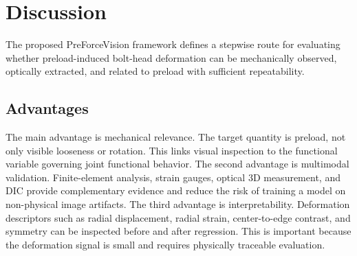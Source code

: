 \section{Discussion}

The proposed PreForceVision framework defines a stepwise route for evaluating whether preload-induced bolt-head deformation can be mechanically observed, optically extracted, and related to preload with sufficient repeatability.

\subsection{Advantages}
The main advantage is mechanical relevance. The target quantity is preload, not only visible looseness or rotation. This links visual inspection to the functional variable governing joint functional behavior. The second advantage is multimodal validation. Finite-element analysis, strain gauges, optical 3D measurement, and DIC provide complementary evidence and reduce the risk of training a model on non-physical image artifacts. The third advantage is interpretability. Deformation descriptors such as radial displacement, radial strain, center-to-edge contrast, and symmetry can be inspected before and after regression. This is important because the deformation signal is small and requires physically traceable evaluation. 


